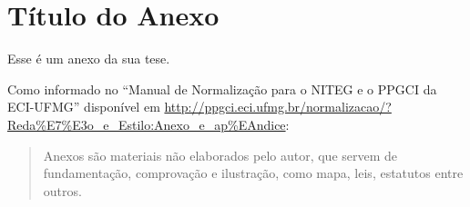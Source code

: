 \chapter{Título do Anexo}
Esse é um anexo da sua tese.

Como informado no ``Manual de Normalização para o NITEG e o PPGCI da ECI-UFMG''
disponível em
\url{http://ppgci.eci.ufmg.br/normalizacao/?Reda%E7%E3o_e_Estilo:Anexo_e_ap%EAndice}:
\begin{quote}
  Anexos são materiais não elaborados pelo autor, que servem de fundamentação,
  comprovação e ilustração, como mapa, leis, estatutos entre outros.
\end{quote}
